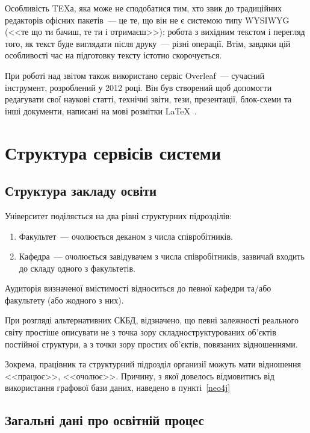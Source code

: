Особливість TEXа, яка може не сподобатися тим, хто звик до традиційних редакторів офісних пакетів~--- це те, що він не є системою типу WYSIWYG (<<те що ти бачиш, те ти і отримаєш>>): робота з вихідним текстом і перегляд того, як текст буде виглядати після друку~--- різні операції. Втім, завдяки цій особливості час на підготовку тексту істотно скорочується.

При роботі над звітом також використано сервіс Overleaf~--- сучасний інструмент, розроблений у 2012 році. Він був створений щоб допомогти редагувати свої наукові статті, технічні звіти, тези, презентації, блок-схеми та інші документи, написані на мові розмітки \LaTeX~\cite{basu2016write}. 

\newpage
\section{Структура сервісів системи}

\subsection{Структура закладу освіти}

Університет поділяється на два рівні структурних підрозділів:
\begin{enumerate}[label={\arabic*.}]
    \item Факультет~--- очолюється деканом з числа співробітників.
    \item Кафедра~--- очолюється завідувачем з числа співробітників, зазвичай входить до складу одного з факультетів.
\end{enumerate}

Аудиторія визначеної вмістимості відноситься до певної кафедри та/або факультету (або жодного з них).

При розгляді альтернативних СКБД, відзначено, що певні залежності реального світу простіше описувати не з точка зору складноструктурованих об'єктів постійної структури, а з точки зору простих об'єктів, повязаних відношеннями.

Зокрема, працівник та структурний підрозділ организії можуть мати відношення <<працює>>, <<очолює>>. Причину, з якої довелось відмовитись від використання графової бази даних, наведено в пункті~\ref{neo4j}

\subsection{Загальні дані про освітній процес}

